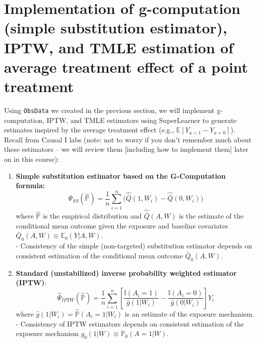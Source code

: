 \documentclass[answers]{exam}
\begin{document}
\section{Implementation of g-computation (simple substitution estimator), IPTW, and TMLE estimation of average treatment effect of a point treatment}

Using \texttt{ObsData} we created in the previous section, we will implement g-computation, IPTW, and TMLE estimators using SuperLearner to generate estimates inspired by the average treatment effect (e.g., $\mathbb{E}[Y_{a=1} - Y_{a=0}]$). Recall from Causal I labs (note: not to worry if you don't remember much about these estimators -- we will review them [including how to implement them] later on in this course):

\begin{enumerate}
\item \textbf{Simple substitution estimator based on the G-Computation formula:} \[
\hat{\Psi}_{SS}(\hat{\mathbb{P}}) = \frac{1}{n} \sum_{i=1}^n  \big( \hat{\bar{Q}}(1, W_i) - \hat{\bar{Q}}(0, W_i) \big)
\]
where $\hat{\mathbb{P}}$ is the empirical distribution and $\hat{\bar{Q}}(A, W)$ is the estimate of the conditional mean outcome given the exposure and baseline covariates $\bar{Q}_0(A,W)\equiv \mathbb{E}_0(Y|A,W)$.\\ 
- Consistency of the simple (non-targeted) substitution estimator depends on consistent estimation of the conditional mean outcome $\bar{Q}_0(A,W)$.\\

\item \textbf{Standard (unstabilized) inverse probability weighted estimator (IPTW)}: 
\[
\hat{\Psi}_{IPTW}(\hat{\mathbb{P}}) = \frac{1}{n}\sum_{i=1}^n \left[ \frac{\mathbb{I}(A_i=1)}{\hat{g}(1|W_i)}  - 
   \frac{\mathbb{I}(A_i=0)}{\hat{g}(0|W_i)} \right] Y_i
\]
where $\hat{g}(1|W_i) = \hat{\mathbb{P}}(A_i=1|W_i)$ is an estimate of the exposure mechanism.\\
- Consistency of IPTW estimators depends on consistent estimation of the exposure mechanism $g_0(1|W) \equiv \mathbb{P}_0(A=1|W)$. \\


\end{enumerate}
\end{document}
